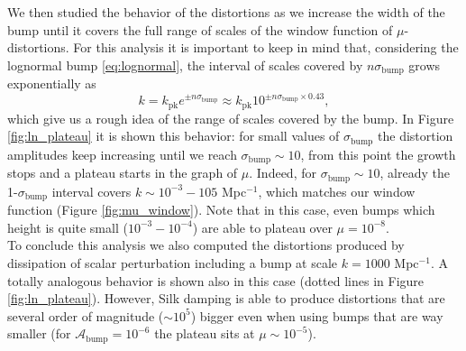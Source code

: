 We then studied the behavior of the distortions as we increase the width of the bump until it covers the full range of scales of the window function of $\mu$-distortions. For this analysis it is important to keep in mind that, considering the lognormal bump \eqref{eq:lognormal}, the interval of scales covered by $n\sigma_\text{bump}$ grows exponentially as
$$k=k_\text{pk}e^{\pm n\sigma_\text{bump}}\approx k_\text{pk}10^{\pm n\sigma_\text{bump}\times 0.43},$$
which give us a rough idea of the range of scales covered by the bump. In Figure \ref{fig:ln_plateau} it is shown this behavior: for small values of $\sigma_\text{bump}$ the distortion amplitudes keep increasing until we reach $\sigma_\text{bump}\sim10$, from this point the growth stops and a plateau starts in the graph of $\mu$. Indeed, for $\sigma_\text{bump}\sim10$, already the 1-$\sigma_\text{bump}$ interval covers $k\sim 10^{-3}-10{5}$ Mpc$^{-1}$, which matches our window function (Figure \ref{fig:mu_window}). Note that in this case, even bumps which height is quite small ($10^{-3}-10^{-4}$) are able to plateau over $\mu=10^{-8}$.\\
To conclude this analysis we also computed the distortions produced by dissipation of scalar perturbation including a bump at scale $k=1000$ Mpc$^{-1}$. A totally analogous behavior is shown also in this case (dotted lines in Figure \ref{fig:ln_plateau}). However, Silk damping is able to produce distortions that are several order of magnitude ($\sim10^5$) bigger even when using bumps that are way smaller (for $\mathcal A_\text{bump}=10^{-6}$ the plateau sits at $\mu\sim 10^{-5}$).

